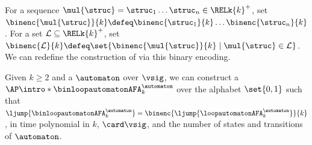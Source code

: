 For a sequence $\mul{\struc} = \struc_1 \dots \struc_n \in \RELk{k}^{+}$,
set $\binenc{\mul{\struc}}{k} \defeq \binenc{\struc_1}{k} \dots \binenc{\struc_n}{k}$.
For a set $\mathcal{L} \subseteq \RELk{k}^{+}$,
set $\binenc{\mathcal{L}}{k} \defeq \set{\binenc{\mul{\struc}}{k} \mid \mul{\struc} \in \mathcal{L}}$.
We can redefine the construction of  via this binary encoding.
\begin{lemma}\label{lemma: to binary AFA}
    Given $k \ge 2$ and a  $\automaton$ over $\vsig$,
    we can construct a  $\AP\intro*\binloopautomatonAFA_{k}^{\automaton}$ over the alphabet $\set{0,1}$
    such that $\ljump{\binloopautomatonAFA_{k}^{\automaton}} = \binenc{\ljump{\loopautomatonAFA_{k}^{\automaton}}}{k}$,
    in time polynomial in $k$, $\card\vsig$, and the number of states and transitions of $\automaton$.
\end{lemma}
